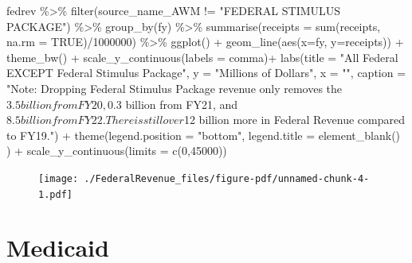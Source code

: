 \documentclass[
  letterpaper,
  DIV=11,
  numbers=noendperiod]{scrreport}
\newenvironment{Shaded}{\begin{snugshade}}{\end{snugshade}}
\newcommand{\AttributeTok}[1]{\textcolor[rgb]{0.40,0.45,0.13}{#1}}
\newcommand{\ConstantTok}[1]{\textcolor[rgb]{0.56,0.35,0.01}{#1}}
\newcommand{\DecValTok}[1]{\textcolor[rgb]{0.68,0.00,0.00}{#1}}
\newcommand{\FunctionTok}[1]{\textcolor[rgb]{0.28,0.35,0.67}{#1}}
\newcommand{\NormalTok}[1]{\textcolor[rgb]{0.00,0.23,0.31}{#1}}
\newcommand{\SpecialCharTok}[1]{\textcolor[rgb]{0.37,0.37,0.37}{#1}}
\newcommand{\StringTok}[1]{\textcolor[rgb]{0.13,0.47,0.30}{#1}}
\begin{document}
\begin{Shaded}
\begin{Highlighting}[]
\NormalTok{fedrev }\SpecialCharTok{\%\textgreater{}\%} 
  \FunctionTok{filter}\NormalTok{(source\_name\_AWM }\SpecialCharTok{!=} \StringTok{"FEDERAL STIMULUS PACKAGE"}\NormalTok{) }\SpecialCharTok{\%\textgreater{}\%}
  \FunctionTok{group\_by}\NormalTok{(fy) }\SpecialCharTok{\%\textgreater{}\%} 
  \FunctionTok{summarise}\NormalTok{(}\AttributeTok{receipts =} \FunctionTok{sum}\NormalTok{(receipts, }\AttributeTok{na.rm =} \ConstantTok{TRUE}\NormalTok{)}\SpecialCharTok{/}\DecValTok{1000000}\NormalTok{) }\SpecialCharTok{\%\textgreater{}\%} 
  \FunctionTok{ggplot}\NormalTok{() }\SpecialCharTok{+}
  \FunctionTok{geom\_line}\NormalTok{(}\FunctionTok{aes}\NormalTok{(}\AttributeTok{x=}\NormalTok{fy, }\AttributeTok{y=}\NormalTok{receipts)) }\SpecialCharTok{+}
      \FunctionTok{theme\_bw}\NormalTok{() }\SpecialCharTok{+}
  \FunctionTok{scale\_y\_continuous}\NormalTok{(}\AttributeTok{labels =}\NormalTok{ comma)}\SpecialCharTok{+}
  \FunctionTok{labs}\NormalTok{(}\AttributeTok{title =} \StringTok{"All Federal EXCEPT Federal Stimulus Package"}\NormalTok{, }
       \AttributeTok{y =} \StringTok{"Millions of Dollars"}\NormalTok{, }\AttributeTok{x =} \StringTok{""}\NormalTok{,}
       \AttributeTok{caption =} \StringTok{"Note: Dropping Federal Stimulus Package revenue only removes the $3.5 billion from FY20, $0.3 billion from FY21, and }
\StringTok{       $8.5 billion from FY22. There is still over $12 billion more in Federal Revenue compared to FY19."}\NormalTok{) }\SpecialCharTok{+} 
  \FunctionTok{theme}\NormalTok{(}\AttributeTok{legend.position =} \StringTok{"bottom"}\NormalTok{, }\AttributeTok{legend.title =} \FunctionTok{element\_blank}\NormalTok{()  ) }\SpecialCharTok{+}
  \FunctionTok{scale\_y\_continuous}\NormalTok{(}\AttributeTok{limits =} \FunctionTok{c}\NormalTok{(}\DecValTok{0}\NormalTok{,}\DecValTok{45000}\NormalTok{))}
\end{Highlighting}
\end{Shaded}

\begin{figure}[H]

{\centering \texttt{[image: ./FederalRevenue\_files/figure-pdf/unnamed-chunk-4-1.pdf]}

}

\end{figure}


\hypertarget{medicaid}{%
\chapter{Medicaid}\label{medicaid}}
\end{document}

